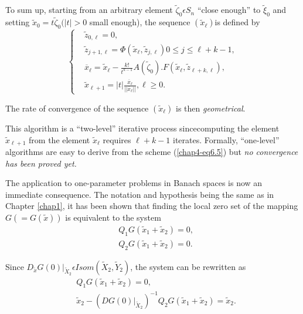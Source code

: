 To sum up, starting from an arbitrary element $\widetilde{\zeta}_{0}
\epsilon S_{n}$ ``close enough'' to $\widetilde{\xi}_{0}$ and setting
$\widetilde{x}_{0} = t\widetilde{\zeta}_{0} (|t| > 0$ small enough),
the sequence $(\widetilde{x}_{\ell})$\pageoriginale is defined by
\begin{equation*}
\begin{cases}
& \widetilde{z}_{0, \ell} = 0,\\
& \widetilde{z}_{j+1, \ell} = \Phi(\widetilde{x}_{\ell},
  \widetilde{z}_{j, \ell}) 0 \leq j \leq \ell + k -1,\\
& \overline{x}_{\ell} = \widetilde{x}_{\ell} - \frac{k!}{t^{k-1}}
  A(\widetilde{\zeta}_{0}). F(\widetilde{x}_{\ell},
  \widetilde{z}_{\ell + k, \ell}),\\
& \widetilde{x}_{\ell + 1} = |t|
  \frac{\overline{x}_{\ell}}{||\overline{x}_{\ell}||}, \ell \geq  0.
\end{cases}\tag{6.5}\label{chap4-eq6.5} 
\end{equation*}

The rate of convergence of the sequence $(\widetilde{x}_{\ell})$ is
then {\em geometrical}.

\begin{remark}\label{chap4-rem6.2}
This algorithm is a ``two-level'' iterative process since\break computing
the element $\widetilde{x}_{\ell + 1}$ from the element
$\widetilde{x}_{\ell}$ requires $\ell + k -1$ iterates. Formally,
``one-level'' algorithms are easy to derive from the scheme
(\ref{chap4-eq6.5}) but {\em no convergence has been proved yet.}
\end{remark}

The application to one-parameter problems in Banach spaces is now an
immediate consequence. The notation and hypothesis being the same as
in Chapter \ref{chap1}, it has been shown that finding the local zero
set of the mapping $G( = G(\widetilde{x}))$ is equivalent to the
system
\begin{align*}
& Q_{1}G(\widetilde{x}_{1} + \widetilde{x}_{2}) = 0,\\
& Q_{2}G(\widetilde{x}_{1} + \widetilde{x}_{2}) = 0.
\end{align*}

Since $D_{\widetilde{x}}G(0) |_{\widetilde{X}_{2}} \epsilon Isom
(\widetilde{X}_{2}, \widetilde{Y}_{2})$, the system can be rewritten
as
\begin{align*}
& Q_{1}G(\widetilde{x}_{1} + \widetilde{x}_{2}) = 0,\\
& \widetilde{x}_{2} - (DG(0) |_{\widetilde{X}_{2}})^{-1}
  Q_{2}G(\widetilde{x}_{1} + \widetilde{x}_{2}) = \widetilde{x}_{2}.
\end{align*}

